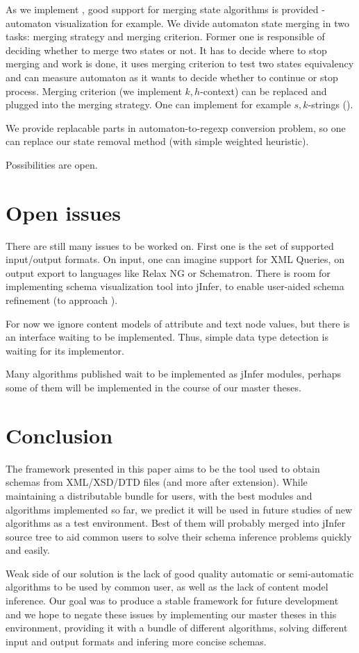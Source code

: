 \documentclass[a4paper,8pt,oneside,twocolumn]{article}
\begin{document}
As we implement \cite{ahonen}, good support for merging state algorithms is provided - automaton visualization for example.
We divide automaton state merging in two tasks: merging strategy and merging criterion.
Former one is responsible of deciding whether to merge two states or not.
It has to decide where to stop merging and work is done, it uses merging criterion to test two states equivalency and can measure automaton as it wants to decide whether to continue or stop process.
Merging criterion (we implement $k,h$-context) can be replaced and plugged into the merging strategy. One can implement for example $s,k$-strings (\cite{Garofalakis:2000:XSE:335191.335409}).

We provide replacable parts in automaton-to-regexp conversion problem, so one can replace our state removal method (with simple weighted heuristic).

Possibilities are open.

\section*{Open issues}
There are still many issues to be worked on.
First one is the set of supported input/output formats.
On input, one can imagine support for XML Queries, on output export to languages like Relax NG or Schematron. 
There is room for implementing schema visualization tool into jInfer, to enable user-aided schema refinement (to approach \cite{Bex:2008:SSI:1376616.1376750}).

For now we ignore content models of attribute and text node values, but there is an interface waiting to be implemented.
Thus, simple data type detection is waiting for its implementor.

Many algorithms published wait to be implemented as jInfer modules, perhaps some of them will be implemented in the course of our master theses.

\section*{Conclusion}
The framework presented in this paper aims to be the tool used to obtain schemas from XML/XSD/DTD files (and more after extension).
While maintaining a distributable bundle for users, with the best modules and algorithms implemented so far, we predict it will be used in future studies of new algorithms as a test environment.
Best of them will probably merged into jInfer source tree to aid common users to solve their schema inference problems quickly and easily.

Weak side of our solution is the lack of good quality automatic or semi-automatic algorithms to be used by common user, as well as the lack of content model inference.
Our goal was to produce a stable framework for future development and we hope to negate these issues by implementing our master theses in this environment, providing it with a bundle of different algorithms, solving different input and output formats and infering more concise schemas.

\nocite{*}
\newpage


\end{document}

